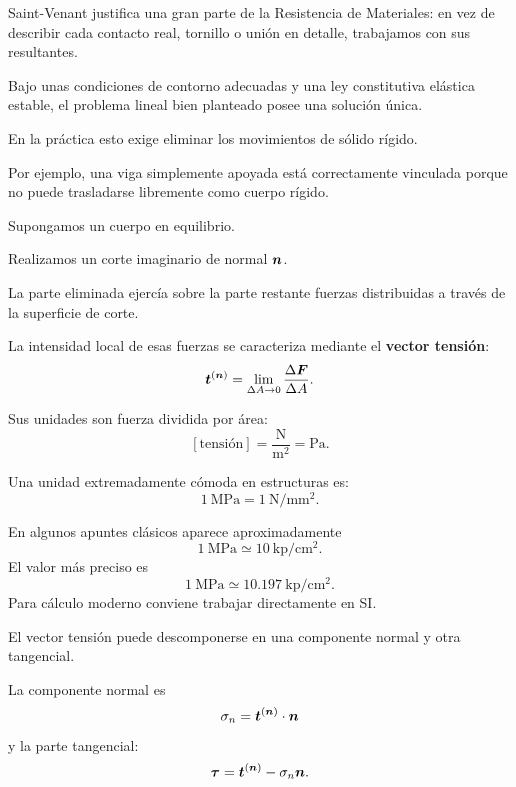 \]

\begin{idea}
Saint-Venant justifica una gran parte de la Resistencia de Materiales: en vez de describir cada contacto real, tornillo o unión en detalle, trabajamos con sus resultantes.
\end{idea}

Bajo unas condiciones de contorno adecuadas y una ley constitutiva elástica estable, el problema lineal bien planteado posee una solución única.

En la práctica esto exige eliminar los movimientos de sólido rígido.

Por ejemplo, una viga simplemente apoyada está correctamente vinculada porque no puede trasladarse libremente como cuerpo rígido.


Supongamos un cuerpo en equilibrio.

Realizamos un corte imaginario de normal $\boldsymbol{n}$.

La parte eliminada ejercía sobre la parte restante fuerzas distribuidas a través de la superficie de corte.

La intensidad local de esas fuerzas se caracteriza mediante el \textbf{vector tensión}:
\[
\boldsymbol{t}^{(\boldsymbol{n})}
=
\lim_{\Delta A\rightarrow 0}
\frac{\Delta \boldsymbol{F}}{\Delta A}.
\]

Sus unidades son fuerza dividida por área:
\[
[\text{tensión}]=\frac{\mathrm{N}}{\mathrm{m^2}}=\mathrm{Pa}.
\]

Una unidad extremadamente cómoda en estructuras es:
\[
1\ \mathrm{MPa}=1\ \mathrm{N/mm^2}.
\]

En algunos apuntes clásicos aparece aproximadamente
\[
1\ \mathrm{MPa}\simeq 10\ \mathrm{kp/cm^2}.
\]
El valor más preciso es
\[
1\ \mathrm{MPa}\simeq 10.197\ \mathrm{kp/cm^2}.
\]
Para cálculo moderno conviene trabajar directamente en SI.

El vector tensión puede descomponerse en una componente normal y otra tangencial.

La componente normal es
\[
\sigma_n=\boldsymbol{t}^{(\boldsymbol{n})}\cdot\boldsymbol{n}
\]
y la parte tangencial:
\[
\boldsymbol{\tau}=\boldsymbol{t}^{(\boldsymbol{n})}-\sigma_n\boldsymbol{n}.
\]

